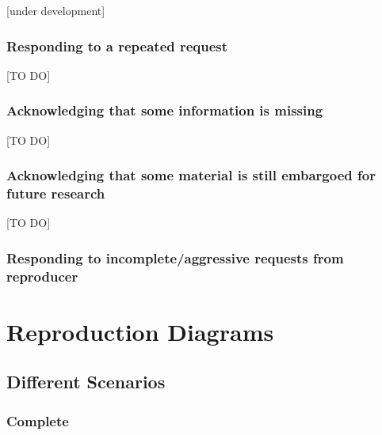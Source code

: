 \documentclass[]{book}
\begin{document}
{[}under development{]}

\hypertarget{responding-to-a-repeated-request}{%
\subsection{Responding to a repeated request}\label{responding-to-a-repeated-request}}

{[}TO DO{]}

\hypertarget{acknowledging-that-some-information-is-missing}{%
\subsection{Acknowledging that some information is missing}\label{acknowledging-that-some-information-is-missing}}

{[}TO DO{]}

\hypertarget{acknowledging-that-some-material-is-still-embargoed-for-future-research}{%
\subsection{Acknowledging that some material is still embargoed for future research}\label{acknowledging-that-some-material-is-still-embargoed-for-future-research}}

{[}TO DO{]}

\hypertarget{responding-to-incompleteaggressive-requests-from-reproducer}{%
\subsection{Responding to incomplete/aggressive requests from reproducer}\label{responding-to-incompleteaggressive-requests-from-reproducer}}

\hypertarget{reproduction-diagrams}{%
\chapter{Reproduction Diagrams}\label{reproduction-diagrams}}

\hypertarget{different-scenarios}{%
\section{Different Scenarios}\label{different-scenarios}}

\hypertarget{complete}{%
\subsection{Complete}\label{complete}}
\end{document}
